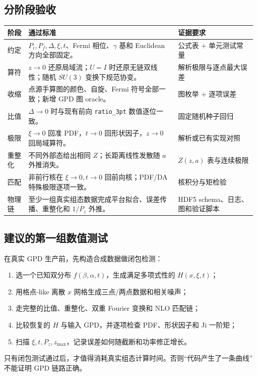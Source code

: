 \documentclass[12pt,a4paper]{ctexart}
\theoremstyle{definition}
\begin{document}
\subsection{分阶段验收}

\begin{xltabular}{\textwidth}{p{1.7cm}p{5.6cm}X}
\toprule
阶段 & 通过标准 & 证据要求 \\
\midrule
\endhead
约定 &
$P_i,P_f,\Delta,\xi,t$、Fermi 相位、$\gamma$ 基和 Euclidean 方向全部固定。 &
公式表 + 单元测试常量 \\
算符 &
$z\to0$ 还原局域流；$U=I$ 时还原无链双线性；随机 $SU(3)$ 变换下规范协变。 &
解析极限与逐点最大误差 \\
收缩 &
点源手算图的颜色、自旋、Fermi 符号全部一致；新增 GPD 图 oracle。 &
图枚举 + 逐项误差 \\
比值 &
$\Delta\to0$ 时与现有前向 \texttt{ratio\_3pt} 数值逐位一致。 &
固定随机种子回归 \\
极限 &
$\xi\to0$ 回准 PDF，$t\to0$ 回形状因子，$z\to0$ 回局域算符。 &
解析或已有实现对照 \\
重整化 &
不同外部态给出相同 $Z$；长距离线性发散随 $a$ 外推消失。 &
$Z(z,a)$ 表与连续极限 \\
匹配 &
非前行核在 $\xi\to0,t\to0$ 回前向核；PDF/DA 特殊极限逐项一致。 &
核积分与矩检验 \\
物理链 &
至少一组真实组态数据完成平台拟合、误差传播、重整化和 $1/P_z$ 外推。 &
HDF5 schema、日志、图和验证脚本 \\
\bottomrule
\end{xltabular}

\subsection{建议的第一组数值测试}

在真实 GPD 生产前，先构造合成数据做闭包检测：
\begin{enumerate}[leftmargin=*]
  \item 选一个已知双分布 $f(\beta,\alpha,t)$，生成满足多项式性的
  $H(x,\xi,t)$；
  \item 用格点-like 离散 $x$ 网格生成三点/两点数据和相关噪声；
  \item 走完整的比值、重整化、双重 Fourier 变换和 NLO 匹配链；
  \item 比较恢复的 $H$ 与输入 GPD，并逐项检查 PDF、形状因子和
  Ji 一阶矩；
  \item 扫描 $\xi,t,P_z,z_{\max}$，记录误差如何随截断和功率修正增长。
\end{enumerate}
只有闭包测试通过后，才值得消耗真实组态计算时间。否则“代码产生了一条曲线”
不能证明 GPD 链路正确。
\end{document}
